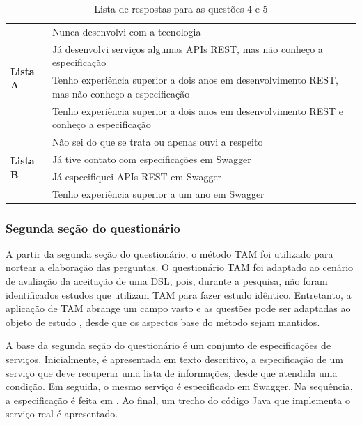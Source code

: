 \begin{table}[!bth] 
\centering
\vspace{0.5cm}

\scriptsize
\begin{tabular}{p{1.5cm}|p{13cm}}
\hline   

\multirow{4}{*}{\textbf{Lista A}} & Nunca desenvolvi com a tecnologia
\\
& Já desenvolvi serviços algumas APIs REST, mas não conheço a
especificação \\
& Tenho experiência superior a dois anos em desenvolvimento REST, mas não conheço
a especificação \\
& Tenho experiência superior a dois anos em desenvolvimento REST e
conheço a especificação \\
\hline
\multirow{4}{*}{\textbf{Lista B}} & Não sei do que se trata ou apenas ouvi a
respeito\\
 & Já tive contato com especificações em Swagger \\
 & Já especifiquei APIs REST em Swagger\\
 & Tenho experiência superior a um ano em Swagger \\
\end{tabular}

\caption{Lista de respostas para as questões 4 e 5}
\label{respostasQ4e5}

\end{table}


\subsubsection{Segunda seção do questionário}

A partir da segunda seção do questionário, o
método TAM foi utilizado para nortear a elaboração das
perguntas.
O questionário TAM foi adaptado ao cenário de avaliação da aceitação de uma DSL,
pois, durante a pesquisa, não foram identificados estudos que utilizam TAM para
fazer estudo idêntico. Entretanto, a aplicação de TAM abrange um campo vasto
e as questões pode ser adaptadas ao objeto de estudo \cite{babar2007evaluating},
desde que os aspectos base do método sejam mantidos.

A base da segunda seção do questionário é um conjunto de especificações de
serviços. Inicialmente, é apresentada em texto
descritivo, a especificação de um serviço que deve recuperar uma lista de
informações, desde que atendida uma condição. Em seguida, o mesmo serviço é especificado em Swagger. Na sequência, a
especificação é feita em \neoidl{}. Ao final, um trecho do código Java que
implementa o serviço real é apresentado.

